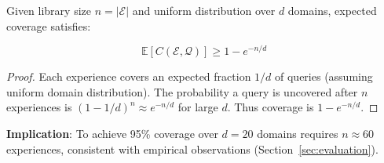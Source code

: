 \begin{theorem}
Given library size $n = |\mathcal{E}|$ and uniform distribution over $d$ domains, expected coverage satisfies:

\begin{equation}
\mathbb{E}[C(\mathcal{E}, \mathcal{Q})] \geq 1 - e^{-n/d}
\end{equation}
\end{theorem}

\begin{proof}
Each experience covers an expected fraction $1/d$ of queries (assuming uniform domain distribution). The probability a query is uncovered after $n$ experiences is $(1 - 1/d)^n \approx e^{-n/d}$ for large $d$. Thus coverage is $1 - e^{-n/d}$.
\end{proof}

\textbf{Implication}: To achieve 95\% coverage over $d=20$ domains requires $n \approx 60$ experiences, consistent with empirical observations (Section~\ref{sec:evaluation}).

